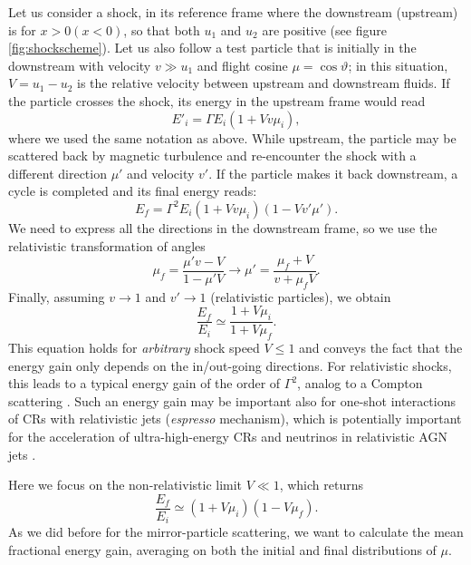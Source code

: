\documentclass[varenna]{cimento}
\begin{document}
Let us consider a shock, in its reference frame where the downstream (upstream) is for $x>0(x<0)$, so that both $u_1$ and $u_2$ are positive (see figure \ref{fig:shockscheme}).
Let us also follow a test particle that is initially in the downstream with velocity $v\gg u_1$ and flight cosine $\mu=\cos\vartheta$; 
in this situation, $V=u_1-u_2$ is the relative velocity between upstream and downstream fluids.
If the particle crosses the shock, its energy in the upstream frame would read
\begin{equation}
    E'_i=\Gamma E_i (1+V v \mu_i),
\end{equation}
where we used the same notation as above.
While upstream, the particle may be scattered back by magnetic turbulence and re-encounter the shock with a different direction $\mu'$ and velocity $v'$.
If the particle makes it back downstream, a cycle is completed and its final energy reads: 
\begin{equation}
    E_f=\Gamma^2 E_i (1+Vv \mu_i)(1-Vv'\mu').
\end{equation}
We need to express all the directions in the downstream frame, so we use the relativistic transformation of angles
\begin{equation}
    \mu_f=\frac{\mu'v-V}{1-\mu'V} \to \mu'=\frac{\mu_f+V}{v+\mu_fV}.
\end{equation}
Finally, assuming $v\to 1$ and $v'\to 1$ (relativistic particles), we obtain 
\begin{equation}\label{eq:efei}
    \frac{E_f}{E_i}\simeq \frac{1+V\mu_i}{1+V\mu_f}.
\end{equation}
This equation holds for \emph{arbitrary} shock speed $V\leq 1$ and conveys the fact that the energy gain only depends on the in/out-going directions. 
For relativistic shocks, this leads to a typical energy gain of the order of $\Gamma^2$, analog to a Compton scattering \cite{vietri03}.
Such an energy gain may be important also for one-shot interactions of CRs with relativistic jets (\emph{espresso} mechanism), which is potentially important for the acceleration of ultra-high-energy CRs and neutrinos in relativistic AGN jets \cite{caprioli15,mbarek+22}.

Here we focus on the non-relativistic limit $V\ll 1$, which returns
\begin{equation}
    \frac{E_f}{E_i}\simeq (1+V\mu_i)(1-V\mu_f).
\end{equation}
As we did before for the mirror-particle scattering, we want to calculate the mean fractional energy gain, averaging on both the initial and final distributions of $\mu$.
\end{document}
